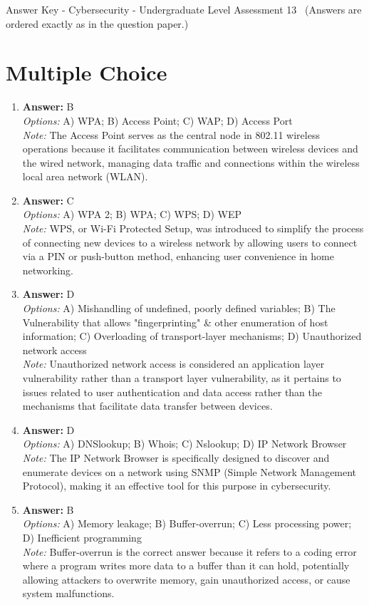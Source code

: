 \documentclass[12pt]{article}
\begin{document}
\begin{center}
Answer Key - Cybersecurity - Undergraduate Level Assessment 13 \
\small (Answers are ordered exactly as in the question paper.)
\end{center}

\section*{Multiple Choice}
\begin{enumerate}[label=\arabic*.]
\item \textbf{Answer:} B
\\ \textit{Options:} A) WPA; B) Access Point; C) WAP; D) Access Port
\\ \textit{Note:} The Access Point serves as the central node in 802.11 wireless operations because it facilitates communication between wireless devices and the wired network, managing data traffic and connections within the wireless local area network (WLAN).
\item \textbf{Answer:} C
\\ \textit{Options:} A) WPA 2; B) WPA; C) WPS; D) WEP
\\ \textit{Note:} WPS, or Wi-Fi Protected Setup, was introduced to simplify the process of connecting new devices to a wireless network by allowing users to connect via a PIN or push-button method, enhancing user convenience in home networking.
\item \textbf{Answer:} D
\\ \textit{Options:} A) Mishandling of undefined, poorly defined variables; B) The Vulnerability that allows "fingerprinting" \& other enumeration of host information; C) Overloading of transport-layer mechanisms; D) Unauthorized network access
\\ \textit{Note:} Unauthorized network access is considered an application layer vulnerability rather than a transport layer vulnerability, as it pertains to issues related to user authentication and data access rather than the mechanisms that facilitate data transfer between devices.
\item \textbf{Answer:} D
\\ \textit{Options:} A) DNSlookup; B) Whois; C) Nslookup; D) IP Network Browser
\\ \textit{Note:} The IP Network Browser is specifically designed to discover and enumerate devices on a network using SNMP (Simple Network Management Protocol), making it an effective tool for this purpose in cybersecurity.
\item \textbf{Answer:} B
\\ \textit{Options:} A) Memory leakage; B) Buffer-overrun; C) Less processing power; D) Inefficient programming
\\ \textit{Note:} Buffer-overrun is the correct answer because it refers to a coding error where a program writes more data to a buffer than it can hold, potentially allowing attackers to overwrite memory, gain unauthorized access, or cause system malfunctions.
\end{enumerate}
\end{document}
